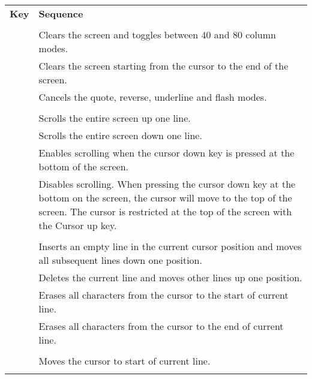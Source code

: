 \begin{center}
\begin{longtable}{c|L{5.5cm}}
	\textbf{Key} & \textbf{Sequence}\\
  \hhline{==}
	\endhead

   \\
  \hhline{==}
  &
Clears the screen and toggles between 40 and 80 column modes.\\
\hline
{}  &
Clears the screen starting from the cursor to the end of the screen.\\
\hline
{}  &
Cancels the quote, reverse, underline and flash modes.\\
  \hhline{==}
   \\
  \hhline{==}
\hline
{}  &
Scrolls the entire screen up one line.\\
\hline
{}  &
Scrolls the entire screen down one line.\\
\hline
{}  &
Enables scrolling when the cursor down key is pressed at the bottom of the screen.\\
\hline
{}  &
Disables scrolling. When pressing the cursor down key at the bottom on the screen, the cursor will move to the top of the screen. The cursor is restricted at the top of the screen with the Cursor up key.\\
  \hhline{==}
   \\
  \hhline{==}
  &
Inserts an empty line in the current cursor position and moves all subsequent lines down one position.\\
\hline
{}  &
Deletes the current line and moves other lines up one position.\\
\hline
{}  &
Erases all characters from the cursor to the start of current line.\\
\hline
{}  &
Erases all characters from the cursor to the end of current line.\\
  \hhline{==}
   \\
  \hhline{==}
  &
Moves the cursor to start of current line.\\
\hline
{}  &

\end{longtable}
\end{center}
